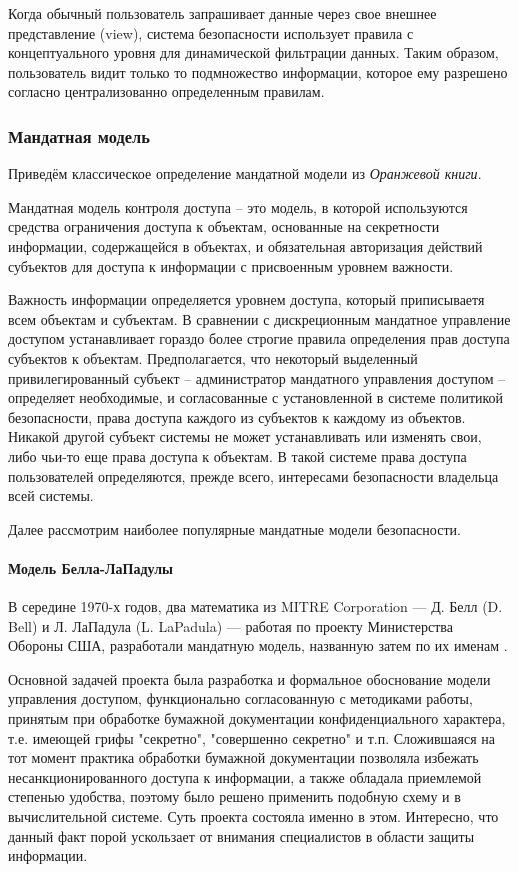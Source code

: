 Когда обычный пользователь запрашивает данные через свое внешнее представление (view), система безопасности использует правила с концептуального уровня для динамической фильтрации данных. Таким образом, пользователь видит только то подмножество информации, которое ему разрешено согласно централизованно определенным правилам.

\subsubsection{Мандатная модель}

Приведём классическое определение мандатной модели из \textit{Оранжевой книги}.

\begin{grayquote}
Мандатная модель контроля доступа – это модель, в которой используются средства ограничения доступа к объектам,  основанные на секретности информации,  содержащейся в объектах, и обязательная авторизация действий субъектов для доступа к информации с присвоенным уровнем важности.
\end{grayquote}

Важность информации определяется уровнем доступа,  который приписываетя всем объектам и субъектам.  В сравнении с дискреционным мандатное управление доступом устанавливает гораздо более строгие правила определения прав доступа субъектов к объектам. Предполагается, что некоторый выделенный привилегированный субъект – администратор мандатного управления доступом – определяет необходимые, и согласованные с установленной в системе политикой безопасности, права доступа каждого из субъектов к каждому из объектов. Никакой другой субъект системы не может устанавливать или изменять свои, либо чьи-то еще права доступа к объектам. В такой системе права доступа пользователей определяются, прежде всего, интересами безопасности владельца всей системы.

Далее рассмотрим наиболее популярные мандатные модели безопасности.

\paragraph{Модель Белла-ЛаПадулы}

В середине 1970-х годов, два математика из MITRE Corporation --- Д. Белл (D. Bell) и Л. ЛаПадула (L. LaPadula) --- работая по проекту Министерства Обороны США, разработали мандатную модель, названную затем по их именам \cite{BellLaPadulaModel}.

Основной задачей проекта была разработка и формальное обоснование модели управления доступом, функционально согласованную с методиками работы, принятым при обработке бумажной документации конфиденциального характера, т.е. имеющей грифы "секретно", "совершенно секретно" и т.п. Сложившаяся на тот момент практика обработки бумажной документации позволяла избежать несанкционированного доступа к информации, а также обладала приемлемой степенью удобства, поэтому было решено применить подобную схему и в вычислительной системе. Суть проекта состояла именно в этом. Интересно, что данный факт порой ускользает от внимания специалистов в области защиты информации.

